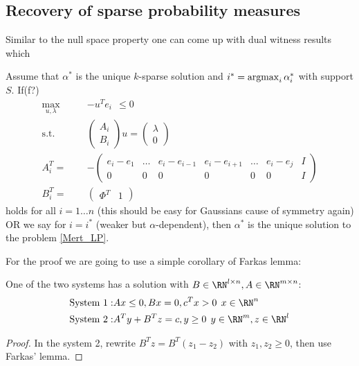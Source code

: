\documentclass{article} %
\begin{document}
\subsection{Recovery of sparse probability measures}

Similar to the null space property one can come up with dual witness results which 
\begin{theorem}
\label{Maxmax_Oneblock}
Assume that $\alpha^*$ is the unique $k$-sparse solution and $i^* = \operatorname{argmax}_i \alpha^*_i$ with support $S$. If(f?)
\begin{align*}
\label{Maxrecovery_condition_Farkas}
\max_{u,\lambda} \qquad &- u^T e_i \:\: \leq 0\\
\text{s.t.} \qquad& \begin{pmatrix} A_i\\ B_i \end{pmatrix} u = \begin{pmatrix} \lambda \\ 0\end{pmatrix}\\
A_i^T = &-\begin{pmatrix} e_i - e_{1} & \dots & e_i - e_{i-1} & e_i - e_{i+1} & \dots & e_i - e_j & I\\
0 & 0 & 0&0&0&0& I
\end{pmatrix}\\
B_i^T = &\begin{pmatrix} \Phi^T & 1\end{pmatrix} 
\end{align*}
holds for all $i = 1\dots n$ (this should be easy for Gaussians cause of symmetry again) OR we say for $i = i^*$ (weaker but $\alpha$-dependent), then $\alpha^*$ is the unique solution to the problem \eqref{Mert_LP}.
\end{theorem}
For the proof we are going to use a simple corollary of Farkas lemma:
\begin{lemma}
\label{Farkas_Corollary}
One of the two systems has a solution with $B \in \RN^{l\times n}, A\in \RN^{m\times n}$:
\begin{align*}
\text{System 1}: & Ax \leq 0, Bx = 0, c^Tx >0\:\: x\in \RN^n\\
\text{System 2}: & A^T y + B^T z = c, y\geq 0\:\: y\in \RN^m, z\in \RN^l
\end{align*}
\end{lemma}
\begin{proof}
In the system 2, rewrite $B^T z = B^T (z_1 - z_2)$ with $z_1,z_2 \geq 0$, then use Farkas' lemma. 
\end{proof}
\end{document}
